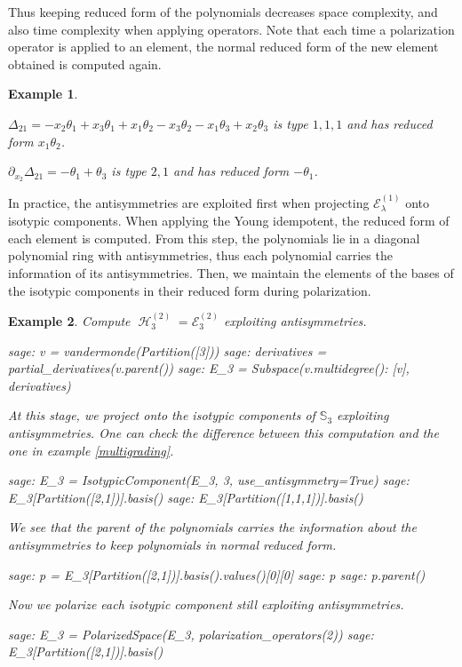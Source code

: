 \documentclass[letter,12pt]{article}
\newcommand{\Sym}[1]{\mathbb{S}_{#1}}
\DeclareMathOperator{\harmonics}{\mathcal{H}}
\newtheorem{example}{Example}
\begin{document}
	Thus keeping reduced form of the polynomials decreases space complexity, and also time complexity when applying operators. Note that each time a polarization operator is applied to an element, the normal reduced form of the new element obtained is computed again. 
	
	\begin{example} ~
		
		$\Delta_{21} = -x_{2} \theta_{1} + x_{3} \theta_{1} + x_{1} \theta_{2} - x_{3} \theta_{2} - x_{1} \theta_{3} + x_{2} \theta_{3}$ is type $1,1,1$ and has reduced form $x_1\theta_2$.
		
		$\partial_{x_2}\Delta_{21} = -\theta_1 + \theta_3$ is type $2,1$ and has reduced form $-\theta_1$.
	\end{example}

	In practice, the antisymmetries are exploited first when projecting $\mathcal{E}_\lambda^{(1)}$ onto isotypic components. When applying the Young idempotent, the reduced form of each element is computed. From this step, the polynomials lie in a diagonal polynomial ring with antisymmetries, thus each polynomial carries the information of its antisymmetries.  
	Then, we maintain the elements of the bases of the isotypic components in their reduced form during polarization. 

	\begin{example}
			Compute $\harmonics_3^{(2)} = \mathcal{E}_3^{(2)}$ exploiting antisymmetries. 
		\begin{sagecommandline}
			sage: v = vandermonde(Partition([3]))
			sage: derivatives = partial_derivatives(v.parent())
			sage: E_3 = Subspace({v.multidegree(): [v]}, derivatives)
		\end{sagecommandline}
		At this stage, we project onto the isotypic components of $\Sym{3}$ exploiting antisymmetries. One can check the difference between this computation and the one in example \ref{multigrading}. 
		\begin{sagecommandline}
			sage: E_3 = IsotypicComponent(E_3, 3, use_antisymmetry=True)
			sage: E_3[Partition([2,1])].basis()
			sage: E_3[Partition([1,1,1])].basis()
		\end{sagecommandline}
		We see that the parent of the polynomials carries the information about the antisymmetries to keep polynomials in normal reduced form.
		\begin{sagecommandline}
			sage: p = E_3[Partition([2,1])].basis().values()[0][0]
			sage: p
			sage: p.parent()
		\end{sagecommandline}
		Now we polarize each isotypic component still exploiting antisymmetries.  
		\begin{sagecommandline}
			sage: E_3 = PolarizedSpace(E_3, polarization_operators(2))
			sage: E_3[Partition([2,1])].basis()
		\end{sagecommandline}
	\end{example}
	
\end{document}
